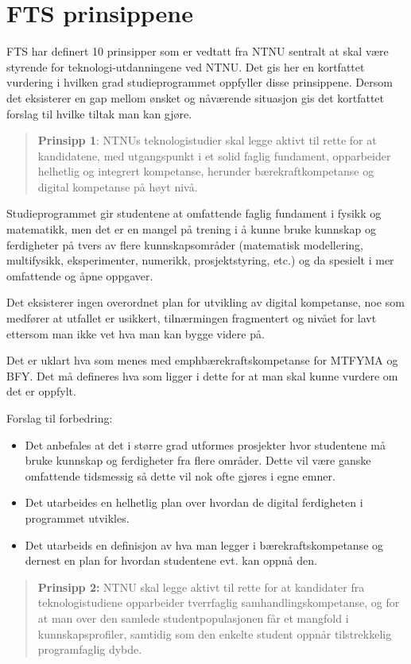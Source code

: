 \section{FTS prinsippene}

FTS har definert 10 prinsipper som er vedtatt fra NTNU sentralt at skal være styrende for teknologi-utdanningene ved NTNU. Det gis her en kortfattet vurdering i hvilken grad studieprogrammet oppfyller disse prinsippene. Dersom det eksisterer en gap mellom ønsket og nåværende situasjon gis det kortfattet forslag til hvilke tiltak man kan gjøre.

\begin{quote}
	\textbf{Prinsipp 1}: NTNUs teknologistudier skal legge aktivt til rette for at kandidatene, med utgangspunkt i et solid faglig fundament, opparbeider helhetlig og integrert kompetanse, herunder bærekraftkompetanse og digital kompetanse på høyt nivå.
\end{quote}

Studieprogrammet gir studentene at omfattende faglig fundament i fysikk og matematikk, men det er en mangel på trening i å kunne bruke kunnskap og ferdigheter på tvers av flere kunnskapsområder (matematisk modellering, multifysikk, eksperimenter, numerikk, prosjektstyring, etc.) og da spesielt i mer omfattende og åpne oppgaver.

Det eksisterer ingen overordnet plan for utvikling av digital kompetanse, noe som medfører at utfallet er usikkert, tilnærmingen fragmentert og nivået for lavt ettersom man ikke vet hva man kan bygge videre på.

Det er uklart hva som menes med emph{bærekraftskompetanse} for MTFYMA og BFY. Det må defineres hva som ligger i dette for at man skal kunne vurdere om det er oppfylt.

Forslag til forbedring:
\begin{itemize}
	\item Det anbefales at det i større grad utformes prosjekter hvor studentene må bruke kunnskap og ferdigheter fra flere områder. Dette vil være ganske omfattende tidsmessig så dette vil nok ofte gjøres i egne emner.
	\item Det utarbeides en helhetlig plan over hvordan de digital ferdigheten i programmet utvikles.
	\item Det utarbeids en definisjon av hva man legger i bærekraftskompetanse og dernest en plan for hvordan studentene evt. kan oppnå den.
\end{itemize}

\begin{quote}
	\textbf{Prinsipp 2:} NTNU skal legge aktivt til rette for at kandidater fra teknologistudiene opparbeider tverrfaglig samhandlingskompetanse, og for at man over den samlede studentpopulasjonen får et mangfold i kunnskapsprofiler, samtidig som den enkelte student oppnår tilstrekkelig programfaglig dybde.
\end{quote}

